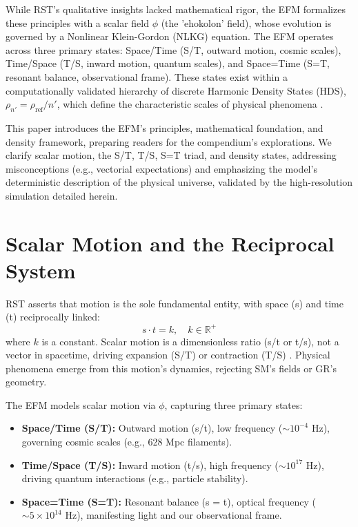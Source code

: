 \documentclass[11pt]{article}
\begin{document}
While RST’s qualitative insights lacked mathematical rigor, the EFM formalizes these principles with a scalar field \(\phi\) (the 'ehokolon' field), whose evolution is governed by a Nonlinear Klein-Gordon (NLKG) equation. The EFM operates across three primary states: Space/Time (S/T, outward motion, cosmic scales), Time/Space (T/S, inward motion, quantum scales), and Space=Time (S=T, resonant balance, observational frame). These states exist within a computationally validated hierarchy of discrete Harmonic Density States (HDS), \(\rho_{n'} = \rho_{\text{ref}}/n'\), which define the characteristic scales of physical phenomena \citep{emvula2025compendium}.

This paper introduces the EFM's principles, mathematical foundation, and density framework, preparing readers for the compendium's explorations. We clarify scalar motion, the S/T, T/S, S=T triad, and density states, addressing misconceptions (e.g., vectorial expectations) and emphasizing the model's deterministic description of the physical universe, validated by the high-resolution simulation detailed herein.

\section{Scalar Motion and the Reciprocal System}
RST asserts that motion is the sole fundamental entity, with space (s) and time (t) reciprocally linked:
\begin{equation}
s \cdot t = k, \quad k \in \mathbb{R}^+
\end{equation}
where \(k\) is a constant. Scalar motion is a dimensionless ratio (s/t or t/s), not a vector in spacetime, driving expansion (S/T) or contraction (T/S) \citep{larson1959}. Physical phenomena emerge from this motion’s dynamics, rejecting SM’s fields or GR’s geometry.

The EFM models scalar motion via \(\phi\), capturing three primary states:
\begin{itemize}
    \item \textbf{Space/Time (S/T):} Outward motion (s/t), low frequency (\(\sim 10^{-4}\) Hz), governing cosmic scales (e.g., 628 Mpc filaments).
    \item \textbf{Time/Space (T/S):} Inward motion (t/s), high frequency (\(\sim 10^{17}\) Hz), driving quantum interactions (e.g., particle stability).
    \item \textbf{Space=Time (S=T):} Resonant balance (s = t), optical frequency (\(\sim 5 \times 10^{14}\) Hz), manifesting light and our observational frame.
\end{itemize}
\end{document}
